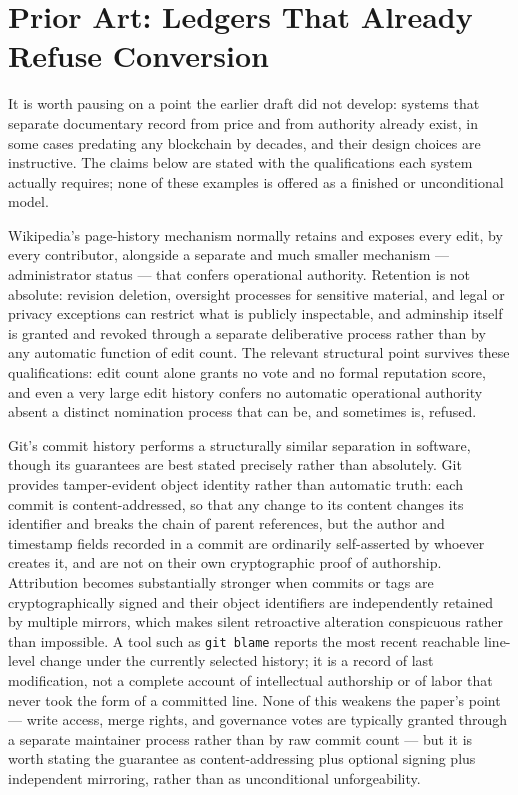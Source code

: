 \documentclass[11pt,oneside]{article}
\theoremstyle{plain}
\theoremstyle{definition}
\begin{document}
\section{Prior Art: Ledgers That Already Refuse Conversion}

It is worth pausing on a point the earlier draft did not develop: systems that separate documentary record from price and from authority already exist, in some cases predating any blockchain by decades, and their design choices are instructive. The claims below are stated with the qualifications each system actually requires; none of these examples is offered as a finished or unconditional model.

Wikipedia's page-history mechanism normally retains and exposes every edit, by every contributor, alongside a separate and much smaller mechanism --- administrator status --- that confers operational authority. Retention is not absolute: revision deletion, oversight processes for sensitive material, and legal or privacy exceptions can restrict what is publicly inspectable, and adminship itself is granted and revoked through a separate deliberative process rather than by any automatic function of edit count. The relevant structural point survives these qualifications: edit count alone grants no vote and no formal reputation score, and even a very large edit history confers no automatic operational authority absent a distinct nomination process that can be, and sometimes is, refused.

Git's commit history performs a structurally similar separation in software, though its guarantees are best stated precisely rather than absolutely. Git provides tamper-evident object identity rather than automatic truth: each commit is content-addressed, so that any change to its content changes its identifier and breaks the chain of parent references, but the author and timestamp fields recorded in a commit are ordinarily self-asserted by whoever creates it, and are not on their own cryptographic proof of authorship. Attribution becomes substantially stronger when commits or tags are cryptographically signed and their object identifiers are independently retained by multiple mirrors, which makes silent retroactive alteration conspicuous rather than impossible. A tool such as \texttt{git blame} reports the most recent reachable line-level change under the currently selected history; it is a record of last modification, not a complete account of intellectual authorship or of labor that never took the form of a committed line. None of this weakens the paper's point --- write access, merge rights, and governance votes are typically granted through a separate maintainer process rather than by raw commit count --- but it is worth stating the guarantee as content-addressing plus optional signing plus independent mirroring, rather than as unconditional unforgeability.
\end{document}
